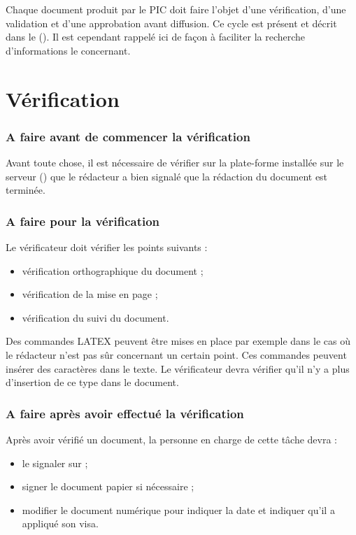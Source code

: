 
Chaque document produit par le PIC doit faire l'objet d'une vérification, d'une validation
et d'une approbation avant diffusion. Ce cycle est présent et décrit dans le \PGC{} (\PGCCourt). Il est cependant rappelé ici de façon à faciliter la recherche d'informations le concernant.

\section{Vérification}
\label{Verification}

\subsubsection*{A faire avant de commencer la vérification}
Avant toute chose, il est nécessaire de vérifier sur la plate-forme installée sur le serveur
(\lintranet) que le rédacteur a bien signalé que la rédaction du document est terminée.

\subsubsection*{A faire pour la vérification}
Le vérificateur doit vérifier les points suivants :
\begin{itemize}
\item vérification orthographique du document ;
\item vérification de la mise en page ;
\item vérification du suivi du document.
\end{itemize}
Des commandes LATEX peuvent être mises en place par exemple dans le cas où le rédacteur
n'est pas sûr concernant un certain point. Ces commandes peuvent insérer des caractères dans le texte.
Le vérificateur devra vérifier qu'il n'y a plus d'insertion de ce type dans le document.

\subsubsection*{A faire après avoir effectué la vérification}

Après avoir vérifié un document, la personne en charge de cette tâche devra :
\begin{itemize}
\item le signaler sur \lintranet ;
\item signer le document papier si nécessaire ;
\item modifier le document numérique pour indiquer la date et indiquer qu'il a appliqué son
visa.
\end{itemize}

